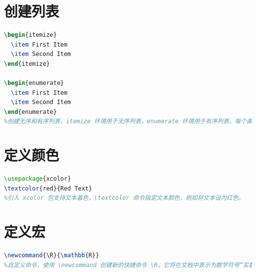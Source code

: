 \documentclass[a4paper, 12pt]{article}
\begin{document}
\section{创建列表}
\begin{lstlisting}[language=TeX]
\begin{itemize}  
  \item First Item
  \item Second Item
\end{itemize}

\begin{enumerate}  
  \item First Item
  \item Second Item
\end{enumerate}
%创建无序和有序列表，itemize 环境用于无序列表，enumerate 环境用于有序列表，每个条目用 \item 开头。
\end{lstlisting}

\section{定义颜色}
\begin{lstlisting}[language=TeX]
\usepackage{xcolor}  
\textcolor{red}{Red Text}
%引入 xcolor 包支持文本着色，\textcolor 命令指定文本颜色，例如将文本设为红色。
\end{lstlisting}

\section{定义宏}
\begin{lstlisting}[language=TeX]
\newcommand{\R}{\mathbb{R}}
%自定义命令，使用 \newcommand 创建新的快捷命令 \R，它将在文档中表示为数学符号“实数集 R”。这样可以简化重复的复杂命令。
\end{lstlisting}
\end{document}
